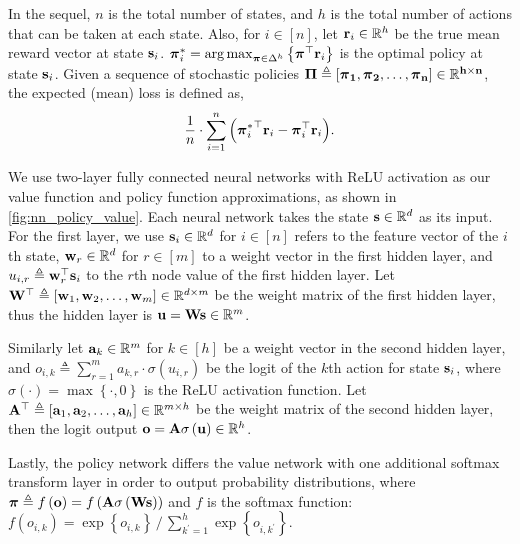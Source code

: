 In the sequel, $n$ is the total number of states, and $h$ is the total number of actions that can be taken at each state.
Also, for $i\in[n]$, let ${\mathbf{r}}_i \in {\mathbb{R}}^h$ be the true mean reward vector at state ${\mathbf{s}}_i$. ${\boldsymbol{\pi}}_i^* = \operatorname*{arg\,max}_{{\boldsymbol{\pi}} \in \Delta^{h}}{\left\{ {\boldsymbol{\pi}}^\top {\mathbf{r}}_i \right\}}$ is the optimal policy at state ${\mathbf{s}}_i$. Given a sequence of  stochastic policies $\bf{\Pi} \triangleq \left[ {\boldsymbol{\pi}}_1, {\boldsymbol{\pi}}_2, \dots, {\boldsymbol{\pi}}_n \right] \in {{\mathbb{R}}}^{h \times n}$, the expected (mean) loss is defined as,
\begin{equation}
\label{eq:expected_loss}
\begin{split}
\frac{1}{n} \cdot \sum\limits_{i=1}^{n}{ \left( {{\boldsymbol{\pi}}_i^*}^\top {\mathbf{r}}_i - {\boldsymbol{\pi}}_i^\top {\mathbf{r}}_i \right) }.
\end{split}
\end{equation}

We use two-layer fully connected neural networks with ReLU activation as our value function and policy function approximations, as shown in \cref{fig:nn_policy_value}. 
Each neural network takes the state ${\mathbf{s}} \in {\mathbb{R}}^d$ as its input. 
For the first layer, we use ${\mathbf{s}}_i \in {\mathbb{R}}^d$ for $i \in [n]$ refers to the feature vector of the $i$th state, ${\mathbf{w}}_r \in {\mathbb{R}}^d$ for $r \in [m]$ to a weight vector in the first hidden layer, and $u_{i,r} \triangleq {\mathbf{w}}_r^\top {\mathbf{s}}_i$ to the $r$th node value of the first hidden layer.
Let ${\mathbf{W}}^\top \triangleq \left[ {\mathbf{w}}_1, {\mathbf{w}}_2, \dots, {\mathbf{w}}_m \right] \in {\mathbb{R}}^{d \times m}$ be the weight matrix of the first hidden layer, thus the hidden layer is ${\mathbf{u}} = {\mathbf{W}}{\mathbf{s}}\in{\mathbb{R}}^m$.

Similarly let ${\mathbf{a}}_k \in {\mathbb{R}}^m$ for $k \in [h]$ be a weight vector in the second hidden layer, and $o_{i,k} \triangleq \sum_{r=1}^{m}{a_{k,r} \cdot \sigma\left( u_{i,r} \right)}$ be the logit of the $k$th action for state ${\mathbf{s}}_i$, where $\sigma(\cdot) = \max\left\{ \cdot, 0 \right\}$ is the ReLU activation function. 
Let ${\mathbf{A}}^\top \triangleq \left[ {\mathbf{a}}_1, {\mathbf{a}}_2, \dots, {\mathbf{a}}_h \right] \in {\mathbb{R}}^{m \times h}$ be the weight matrix of the second hidden layer, then the logit output ${\mathbf{o}} = {\mathbf{A}}\sigma\left( {\mathbf{u}}\right) \in {\mathbb{R}}^h$.

Lastly, the policy network differs the value network with one additional softmax transform layer in order to output probability distributions, where ${\boldsymbol{\pi}} \triangleq f\left( {\mathbf{o}} \right) = f\left( {\mathbf{A}} \sigma\left( {\mathbf{W}} {\mathbf{s}} \right) \right)$ and $f$ is the softmax function: $f\left( o_{i,k} \right) = \exp\left\{ o_{i,k} \right\} \,/\, \sum_{k^\prime = 1}^{h}{\exp\left\{ o_{i,k^\prime} \right\}}$.